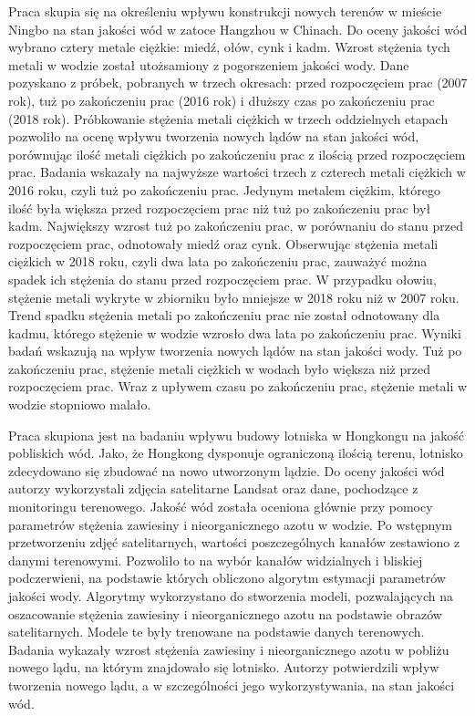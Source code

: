 \documentclass{amuthesis}
\begin{document}
Praca \textcite{hao2021effects} skupia się na określeniu wpływu
konstrukcji nowych terenów w mieście Ningbo na stan jakości wód w zatoce
Hangzhou w Chinach. Do oceny jakości wód wybrano cztery metale ciężkie:
miedź, ołów, cynk i kadm. Wzrost stężenia tych metali w wodzie został
utożsamiony z pogorszeniem jakości wody. Dane pozyskano z próbek,
pobranych w trzech okresach: przed rozpoczęciem prac (2007 rok), tuż po
zakończeniu prac (2016 rok) i dłuższy czas po zakończeniu prac (2018
rok). Próbkowanie stężenia metali ciężkich w trzech oddzielnych etapach
pozwoliło na ocenę wpływu tworzenia nowych lądów na stan jakości wód,
porównując ilość metali ciężkich po zakończeniu prac z ilością przed
rozpoczęciem prac. Badania wskazały na najwyższe wartości trzech z
czterech metali ciężkich w 2016 roku, czyli tuż po zakończeniu prac.
Jedynym metalem ciężkim, którego ilość była większa przed rozpoczęciem
prac niż tuż po zakończeniu prac był kadm. Największy wzrost tuż po
zakończeniu prac, w porównaniu do stanu przed rozpoczęciem prac,
odnotowały miedź oraz cynk. Obserwując stężenia metali ciężkich w 2018
roku, czyli dwa lata po zakończeniu prac, zauważyć można spadek ich
stężenia do stanu przed rozpoczęciem prac. W przypadku ołowiu, stężenie
metali wykryte w zbiorniku było mniejsze w 2018 roku niż w 2007 roku.
Trend spadku stężenia metali po zakończeniu prac nie został odnotowany
dla kadmu, którego stężenie w wodzie wzrosło dwa lata po zakończeniu
prac. Wyniki badań wskazują na wpływ tworzenia nowych lądów na stan
jakości wody. Tuż po zakończeniu prac, stężenie metali ciężkich w wodach
było większa niż przed rozpoczęciem prac. Wraz z upływem czasu po
zakończeniu prac, stężenie metali w wodzie stopniowo malało.

Praca \textcite{wang2023observations} skupiona jest na badaniu wpływu
budowy lotniska w Hongkongu na jakość pobliskich wód. Jako, że Hongkong
dysponuje ograniczoną ilością terenu, lotnisko zdecydowano się zbudować
na nowo utworzonym lądzie. Do oceny jakości wód autorzy wykorzystali
zdjęcia satelitarne Landsat oraz dane, pochodzące z monitoringu
terenowego. Jakość wód została oceniona głównie przy pomocy parametrów
stężenia zawiesiny i nieorganicznego azotu w wodzie. Po wstępnym
przetworzeniu zdjęć satelitarnych, wartości poszczególnych kanałów
zestawiono z danymi terenowymi. Pozwoliło to na wybór kanałów
widzialnych i bliskiej podczerwieni, na podstawie których obliczono
algorytm estymacji parametrów jakości wody. Algorytmy wykorzystano do
stworzenia modeli, pozwalających na oszacowanie stężenia zawiesiny i
nieorganicznego azotu na podstawie obrazów satelitarnych. Modele te były
trenowane na podstawie danych terenowych. Badania wykazały wzrost
stężenia zawiesiny i nieorganicznego azotu w pobliżu nowego lądu, na
którym znajdowało się lotnisko. Autorzy potwierdzili wpływ tworzenia
nowego lądu, a w szczególności jego wykorzystywania, na stan jakości
wód.
\end{document}
